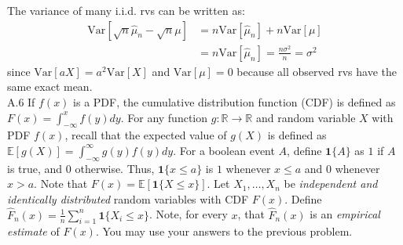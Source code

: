 \documentclass{article}
\newcommand{\field}[1]{\mathbb{#1}}
\newcommand{\1}{\mathbf{1}}
\newcommand{\E}{\mathbb{E}}
\newcommand{\R}{\field{R}} %
\begin{document}
The variance of many i.i.d. rvs can be written as:
\begin{align*}
    \text{Var}[\sqrt n \hat\mu_n - \sqrt n \mu] &= n\text{Var}[\hat\mu_n]+n\text{Var}[\mu] \\
    &= n \text{Var}[\hat\mu_n] = \frac{n\sigma^2}{n} = \sigma^2
\end{align*}
since $\text{Var}[aX]=a^2\text{Var}[X]$ and $\text{Var}[\mu]=0$ because all observed rvs have the same exact mean.\\

\newpage
A.6 If $f(x)$ is a PDF, the cumulative distribution function (CDF) is  defined as $F(x) = \int_{-\infty}^x f(y) dy$.  For any function $g : \R \rightarrow \R$ and random variable $X$ with PDF $f(x)$, recall that the expected value of $g(X)$ is defined as $\E[g(X)] = \int_{-\infty}^\infty g(y) f(y) dy$. For a boolean event $A$, define $\1\{ A \}$ as $1$ if $A$ is true, and $0$ otherwise. Thus, $\1\{ x \leq a \}$ is $1$ whenever $x \leq a$ and
  $0$ whenever $x > a$.  Note that $F(x) = \E[\1\{X \leq x\}]$.  Let $X_1,\dots,X_n$ be \emph{independent and identically distributed} random variables with CDF $F(x)$.  Define $\widehat{F}_n(x) = \frac{1}{n} \sum_{i=1}^n \1\{X_i \leq x\}$. Note, for every $x$, that $\widehat{F}_n(x)$ is an \emph{empirical estimate} of  $F(x)$. You may use your answers to the previous problem. 
\end{document}
